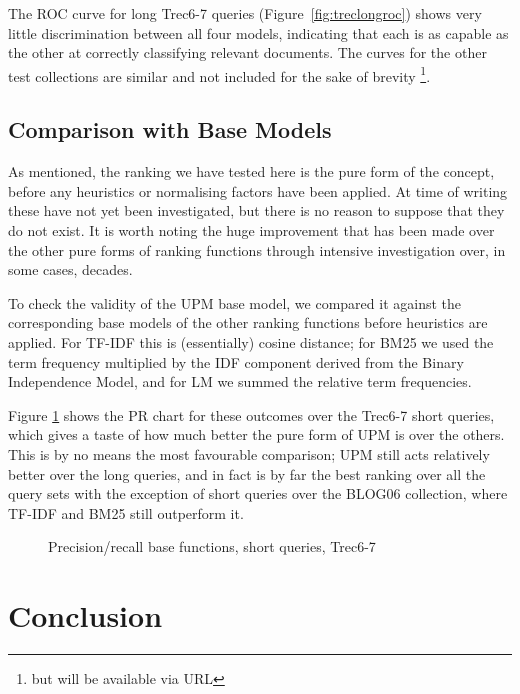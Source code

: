 The ROC curve for long Trec6-7 queries (Figure~\ref{fig:treclongroc}) shows very little discrimination between all four models, indicating that each is as capable as the other at correctly classifying relevant documents. The curves for the other test collections are similar and not included for the sake of brevity%
\footnote{but will be available via URL}.

\subsection{Comparison with Base Models}

As mentioned, the ranking we have tested here is the pure form of the concept, before any heuristics or normalising factors have been applied. At time of writing these have not yet been investigated, but there is no reason to suppose that they do not exist. It is worth noting the huge improvement that has been made over the other pure forms of ranking functions through intensive investigation over, in some cases, decades. 

To check the validity of the UPM base model, we compared it against the corresponding base models of the other ranking functions before heuristics are applied. For TF-IDF this is (essentially) cosine distance; for BM25 we used the term frequency multiplied by the IDF component derived from the Binary Independence Model, and for LM we summed the relative term frequencies.

Figure \ref{fig:trecshortbase} shows the PR chart for these outcomes over the Trec6-7 short queries, which gives a taste of how much better the pure form of UPM is over the others. This is by no means the most favourable comparison; UPM still acts relatively better over the long queries, and in fact is by far the best ranking over all the query sets with the exception of short queries over the BLOG06 collection, where TF-IDF and BM25 still outperform it.

\begin{figure}[h]
\centering
\caption{Precision/recall base functions, short queries, Trec6-7}
\label{fig:trecshortbase}
\end{figure}

\section{Conclusion}

